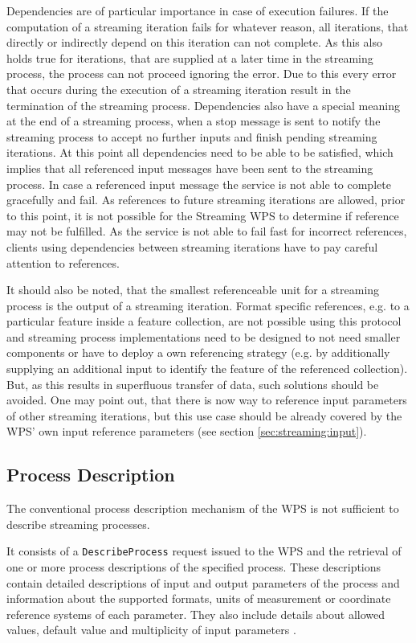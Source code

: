 		Dependencies are of particular importance in case of execution failures. If the computation of a streaming iteration fails for whatever reason, all iterations, that directly or indirectly depend on this iteration can not complete. As this also holds true for iterations, that are supplied at a later time in the streaming process, the process can not proceed ignoring the error. Due to this every error that occurs during the execution of a streaming iteration result in the termination of the streaming process.
		Dependencies also have a special meaning at the end of a streaming process, when a stop message is sent to notify the streaming process to accept no further inputs and finish pending streaming iterations. At this point all dependencies need to be able to be satisfied, which implies that all referenced input messages have been sent to the streaming process. In case a referenced input message the service is not able to complete gracefully and fail. As references to future streaming iterations are allowed, prior to this point, it is not possible for the Streaming \ac{WPS} to determine if reference may not be fulfilled. As the service is not able to fail fast for incorrect references, clients using dependencies between streaming iterations have to pay careful attention to references.

		It should also be noted, that the smallest referenceable unit for a streaming process is the output of a streaming iteration. Format specific references, e.g. to a particular feature inside a feature collection, are not possible using this protocol and streaming process implementations need to be designed to not need smaller components or have to deploy a own referencing strategy (e.g. by additionally supplying an additional input to identify the feature of the referenced collection). But, as this results in superfluous transfer of data, such solutions should be avoided. One may point out, that there is now way to reference input parameters of other streaming iterations, but this use case should be already covered by the \ac{WPS}' own input reference parameters (see section \ref{sec:streaming:input}).

	\subsection{Process Description}
		\label{sec:stream:processdescription}
		The conventional process description mechanism of the \ac{WPS} is not sufficient to describe streaming processes.

		It consists of a \texttt{DescribeProcess} request issued to the \ac{WPS} and the retrieval of one or more process descriptions of the specified process. These descriptions contain detailed descriptions of input and output parameters of the process and information about the supported formats, units of measurement or coordinate reference systems of each parameter. They also include details about allowed values, default value and multiplicity of input parameters \citep{ogc:wps}.

